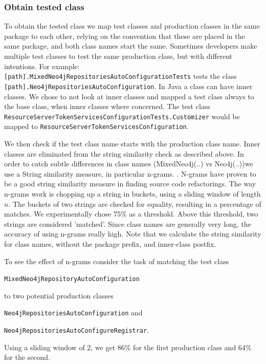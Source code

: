 \subsubsection{Obtain tested class}
To obtain the tested class we map test classes and production classes in the same package to each other, relying on the convention that these are placed in the same package, and both class names start the same. Sometimes developers make multiple test classes to test the same production class, but with different intentions. For example: \texttt{[path].MixedNeo4jRepositoriesAutoConfigurationTests} tests the class  \texttt{[path].Neo4jRepositoriesAutoConfiguration}. In Java a class can have inner classes. We chose to not look at inner classes and mapped a test class always to the base class, when inner classes where concerned. The test class \texttt{ResourceServerTokenServicesConfigurationTests.Customizer} would be mapped to  \texttt{ResourceServerTokenServicesConfiguration}. 

We then check if the test class name starts with the production class name. Inner classes are eliminated from the string similarity check as described above. In order to catch subtle differences in class names (MixedNeo4j(..) vs Neo4j(..))we use a String similarity measure, in particular n-grams. . N-grams have proven to be a good string similarity measure in finding source code refactorings. The way n-grams work is chopping up a string in buckets, using a sliding window of length $n$. The buckets of two strings are checked for equality, resulting in a percentage of matches. We experimentally chose 75\% as a threshold. Above this threshold, two strings are considered 'matched'. Since class names are generally very long, the accuracy of using n-grams really high. Note that we calculate the string similarity for class names, without the package prefix, and inner-class postfix. 

To see the effect of n-grams consider the task of matching the test class

\texttt{MixedNeo4jRepositoryAutoConfiguration}

to two potential production classes

\texttt{Neo4jRepositoriesAutoConfiguration} and

\texttt{Neo4jRepositoriesAutoConfigureRegistrar}. 

Using a sliding window of 2, we get 86\% for the first production class and 64\% for the second.  


